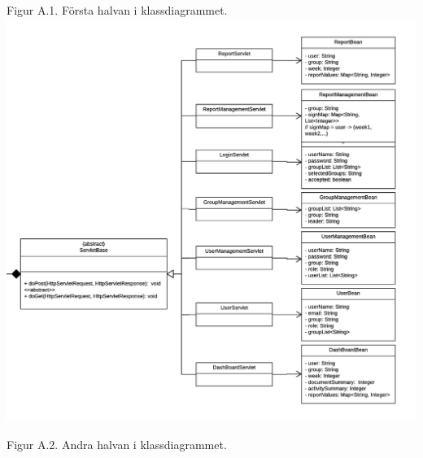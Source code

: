 \documentclass[paper=a4, fontsize=11pt,twoside]{article}
\begin{document}
Figur A.1. Första halvan i klassdiagrammet.
\includegraphics{Klassdiagram2}%

Figur A.2. Andra halvan i klassdiagrammet.
\end{document}
